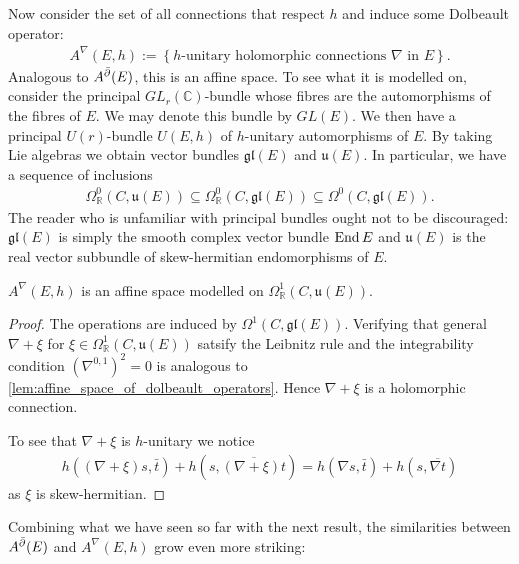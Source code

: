 \documentclass[12pt]{ociamthesis}  %
\begin{document}
Now consider the set of all connections that respect $h$ and induce
some Dolbeault operator:
\begin{align*}
  A^\nabla(E,h) := \left\lbrace{\text{$h$-unitary holomorphic connections $\nabla$ in $E$}}\right\rbrace.
\end{align*}
Analogous to $A^{\bar{\partial}} (E)$, this is an affine space. To see what it is
modelled on, consider the principal $GL_r(\mathbb{C})$-bundle whose fibres
are the automorphisms of the fibres of $E$. We may denote this bundle by $GL(E)$.
We then have a principal $U(r)$-bundle $U(E,h)$ of $h$-unitary automorphisms
of $E$. By taking Lie algebras we obtain vector bundles $\mathfrak{gl}(E)$
and $\mathfrak u(E)$. In particular, we have a sequence of inclusions
\begin{align*}
  \Omega^0_{\mathbb{R}}(C,\mathfrak u(E))
  \subseteq \Omega^0_{\mathbb{R}}(C,\mathfrak{gl}(E))
  \subseteq \Omega^0(C,\mathfrak{gl}(E)).
\end{align*}
The reader who is unfamiliar with principal bundles
ought not to be discouraged: $\mathfrak{gl}(E)$ is simply the smooth complex
vector bundle $\operatorname{End} E$ and $\mathfrak{u}(E)$ is the real vector subbundle
of skew-hermitian endomorphisms of $E$.

\begin{lemma}
  $A^\nabla(E,h)$ is an affine space modelled on
  $\Omega^1_{\mathbb{R}}(C,\mathfrak u(E))$.
  \begin{proof}
    The operations are induced by $\Omega^1(C,\mathfrak{gl}(E))$.
    Verifying that general $\nabla + \xi$ for
    $\xi\in\Omega^1_{\mathbb{R}}(C,\mathfrak u(E))$
    satsify the Leibnitz rule and the integrability
    condition $(\nabla^{0,1})^2=0$ is analogous to
    \ref{lem:affine_space_of_dolbeault_operators}. Hence $\nabla + \xi$
    is a holomorphic connection.

    To see that $\nabla + \xi$ is $h$-unitary we notice
    \begin{align*}
      h((\nabla + \xi)s, \bar t) + h(s,\overline{(\nabla + \xi)t})
      =  h(\nabla s, \bar t) + h(s,\overline{\nabla t})
    \end{align*}
    as $\xi$ is skew-hermitian.
  \end{proof}
\end{lemma}

Combining what we have seen so far with the next result, the
similarities between $A^{\bar{\partial}} (E)$ and $A^\nabla(E,h)$ grow even more
striking:
\end{document}
